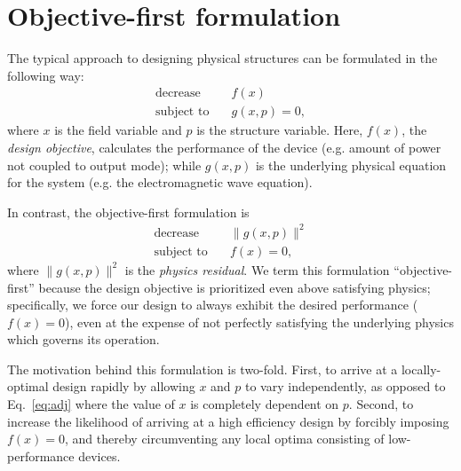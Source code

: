 \documentclass[letterpaper,10pt]{article}
\begin{document}
\section{Objective-first formulation}
The typical approach to designing physical structures can be formulated 
    in the following way:
    \begin{subequations}\label{eq:adj}
    \begin{align} 
    \text{decrease} & \quad f(x) \label{eq:adj:obj} \\ 
    \text{subject to} & \quad g(x,p) = 0, \label{eq:adj:con}
    \end{align}
    \end{subequations}
    where $x$ is the field variable and $p$ is the structure variable.
Here, $f(x)$, the \emph{design objective}, 
    calculates the performance of the device 
    (e.g. amount of power not coupled to output mode); 
    while $g(x,p)$ is the underlying physical equation for the system
    (e.g. the electromagnetic wave equation).

In contrast, the objective-first formulation is
    \begin{subequations}\label{eq:ob1}
    \begin{align} 
    \text{decrease} & \quad \|g(x,p)\|^2 \label{eq:ob1:obj} \\ 
    \text{subject to} & \quad f(x) = 0, \label{eq:ob1:con}
    \end{align}
    \end{subequations}
    where $\|g(x,p)\|^2$ is the \emph{physics residual}.
We term this formulation ``objective-first''
    because the design objective is prioritized even above satisfying physics;
    specifically, we force our design to always exhibit the desired performance
    ($f(x) = 0$), even at the expense of
    not perfectly satisfying the underlying physics which governs its operation.

The motivation behind this formulation is two-fold.
First, to arrive at a locally-optimal design rapidly 
    by allowing $x$ and $p$ to vary independently, 
    as opposed to Eq.~\ref{eq:adj}
    where the value of $x$ is completely dependent on $p$.
Second, to increase the likelihood of arriving at a high efficiency design
    by forcibly imposing $f(x) = 0$,
    and thereby circumventing any local optima consisting of
    low-performance devices.
\end{document}
